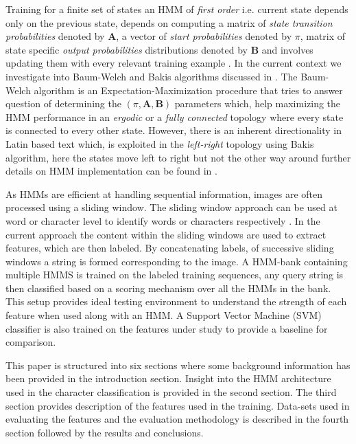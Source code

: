 \documentclass[runningheads]{llncs}
\def\A{{\mathbf A}}
\def\B{{\mathbf B}}
\begin{document}
Training for a finite set of states an HMM of \emph{first order} i.e. current state depends only on the previous state,  depends on computing a matrix of \emph{state transition probabilities} denoted by $\A$, a vector of \emph{start probabilities} denoted by $\pi$, matrix of state specific \emph{output probabilities} distributions denoted by $\B$ and involves updating them with every relevant training example \cite{Rabi89}. In the current context we investigate into Baum-Welch and Bakis algorithms discussed in \cite{Rabi89}. The Baum-Welch algorithm is an Expectation-Maximization procedure that tries to answer question of determining the $(\pi, \A, \B)$ parameters which, help maximizing the HMM performance in an \emph{ergodic} or a \emph{fully connected} topology where every state is connected to every other state. However, there is an inherent directionality in Latin based text which, is exploited in the \emph{left-right} topology using Bakis algorithm, here the states move left to right but not the other way around further details on HMM implementation can be found in \cite{Rabi89}.

As HMMs are efficient at handling sequential information, images are often processed using a sliding window. The sliding window approach can be used at word or character level to identify words or characters respectively \cite{Fink09}. In the current approach the content within the sliding windows are used to extract features, which are then labeled. By concatenating labels, of successive sliding windows a string is formed corresponding to the image. A HMM-bank containing multiple HMMS is trained on the labeled training sequences, any query string is then classified based on a scoring mechanism over all the HMMs in the bank. This setup provides ideal testing environment to understand the strength of each feature when used along with an HMM. A Support Vector Machine (SVM) classifier is also trained on the features under study to provide a baseline for comparison.

This paper is structured into six sections where some background information has been provided in the introduction section. Insight into the HMM architecture used in the character classification is provided in the second section. The third section provides description of the features used in the training. Data-sets used in evaluating the features and the evaluation methodology is described in the fourth section followed by the results and conclusions.
\end{document}
